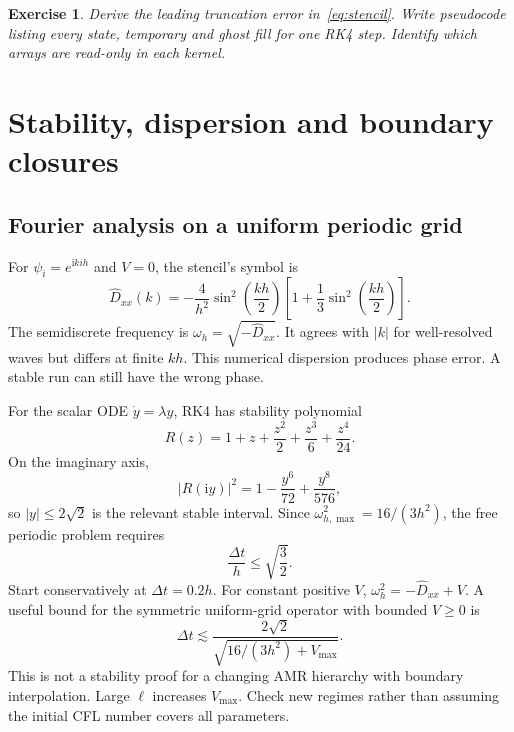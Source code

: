 \documentclass[11pt,a4paper]{article}
\numberwithin{equation}{section}
\newtheorem{exercise}{Exercise}[section]
\newcommand{\ii}{\mathrm{i}}
\begin{document}
\begin{exercise}
Derive the leading truncation error in~\eqref{eq:stencil}. Write pseudocode
listing every state, temporary and ghost fill for one RK4 step. Identify
which arrays are read-only in each kernel.
\end{exercise}

\section{Stability, dispersion and boundary closures}\label{sec:stability}

\subsection{Fourier analysis on a uniform periodic grid}
For $\psi_i=e^{\ii kih}$ and $V=0$, the stencil's symbol is
\begin{equation}
 \widehat D_{xx}(k)=-\frac4{h^2}\sin^2\left(\frac{kh}{2}\right)
     \left[1+\frac13\sin^2\left(\frac{kh}{2}\right)\right].
\end{equation}
The semidiscrete frequency is $\omega_h=\sqrt{-\widehat D_{xx}}$.
It agrees with $|k|$ for well-resolved waves but differs at finite $kh$.
This numerical dispersion produces phase error. A stable run can still
have the wrong phase.

For the scalar ODE $\dot y=\lambda y$, RK4 has stability polynomial
\begin{equation}
 R(z)=1+z+\frac{z^2}{2}+\frac{z^3}{6}+\frac{z^4}{24}.
\end{equation}
On the imaginary axis,
\begin{equation}
 |R(\ii y)|^2=1-\frac{y^6}{72}+\frac{y^8}{576},
\end{equation}
so $|y|\leq2\sqrt2$ is the relevant stable interval. Since
$\omega_{h,\max}^2=16/(3h^2)$, the free periodic problem requires
\begin{equation}
 \frac{\Delta t}{h}\leq\sqrt{\frac32}.
\end{equation}
Start conservatively at $\Delta t=0.2h$.
For constant positive $V$, $\omega_h^2=-\widehat D_{xx}+V$.
A useful bound for the symmetric uniform-grid operator with bounded
$V\geq0$ is
\begin{equation}
 \Delta t\lesssim
 \frac{2\sqrt2}{\sqrt{16/(3h^2)+V_{\max}}}.
\end{equation}
This is not a stability proof for a changing AMR hierarchy with boundary
interpolation. Large $\ell$ increases $V_{\max}$. Check new regimes
rather than assuming the initial CFL number covers all parameters.
\end{document}
